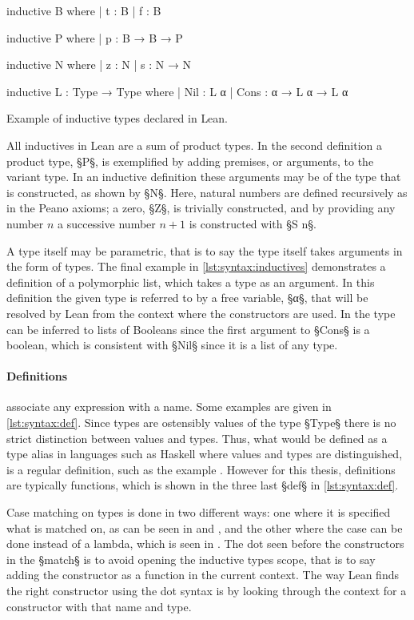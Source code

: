 \begin{listing}[ht]
\begin{LeanCode}
inductive B where | t : B | f : B

inductive P where | p : B → B → P

inductive N where | z : N | s : N → N

inductive L : Type → Type where
  | Nil : L α
  | Cons : α → L α → L α
\end{LeanCode}
\caption{Example of inductive types declared in Lean.}
\label{lst:syntax:inductives}
\end{listing}

All inductives in Lean are a sum of product types.
In the second definition a product type, §P§, is exemplified by adding premises, or arguments, to the variant type.
In an inductive definition these arguments may be of the type that is constructed, as shown by §N§.
Here, natural numbers are defined recursively as in the Peano axioms; a zero, §Z§, is trivially constructed, and by providing any number $n$ a successive number $n+1$ is constructed with §S n§.

A type itself may be parametric, that is to say the type itself takes arguments in the form of types.
The final example in \cref{lst:syntax:inductives} demonstrates a definition of a polymorphic list, which takes a type as an argument.
In this definition the given type is referred to by a free variable, §α§, that will be resolved by Lean from the context where the constructors are used.
In  the type can be inferred to lists of Booleans since the first argument to §Cons§ is a boolean, which is consistent with §Nil§ since it is a list of any type.

\paragraph*{Definitions} associate any expression with a name.
Some examples are given in \cref{lst:syntax:def}.
Since types are ostensibly values of the type §Type§ there is no strict distinction between values and types.
Thus, what would be defined as a type alias in languages such as Haskell where values and types are distinguished, is a regular definition, such as the example .
However for this thesis, definitions are typically functions, which is shown in the three last §def§ in \cref{lst:syntax:def}.

Case matching on types is done in two different ways: one where it is specified what is matched on, as can be seen in  and , and the other where the case can be done instead of a lambda, which is seen in .
The dot seen before the constructors in the §match§ is to avoid opening the inductive types scope, that is to say adding the constructor as a function in the current context.
The way Lean finds the right constructor using the dot syntax is by looking through the context for a constructor with that name and type.

